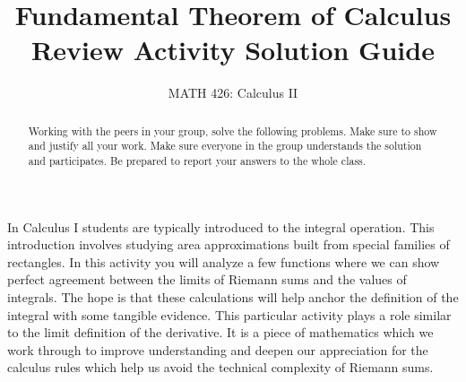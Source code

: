 \documentclass{ximera}
\title{Fundamental Theorem of Calculus Review Activity Solution Guide}
\author{MATH 426: Calculus II}
\begin{document}
\begin{abstract}
   Working with the peers in your group, solve the following problems. Make sure to show and justify all your work. Make sure everyone in the group understands the solution and participates. Be prepared to report your answers to the whole class. 
\end{abstract}
\maketitle


In Calculus I students are typically introduced to the integral operation. This introduction involves studying area approximations built from special families of rectangles. In this activity you will analyze a few functions where we can show perfect agreement between the limits of Riemann sums and the values of integrals. The hope is that these calculations will help anchor the definition of the integral with some tangible evidence. This particular activity plays a role similar to the limit definition of the derivative. It is a piece of mathematics which we work through to improve understanding and deepen our appreciation for the calculus rules which help us avoid the technical complexity of Riemann sums.

\end{document}
